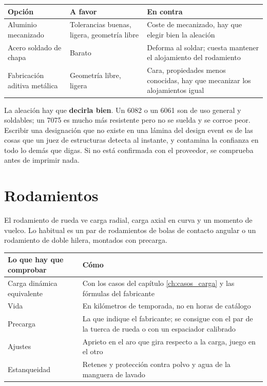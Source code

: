 \begin{center}
\begin{tabularx}{\textwidth}{@{}lXX@{}}
\toprule
\textbf{Opción} & \textbf{A favor} & \textbf{En contra} \\
\midrule
Aluminio mecanizado & Tolerancias buenas, ligera, geometría libre & Coste de mecanizado, hay que elegir bien la aleación \\
Acero soldado de chapa & Barato & Deforma al soldar; cuesta mantener el alojamiento del rodamiento \\
Fabricación aditiva metálica & Geometría libre, ligera & Cara, propiedades menos conocidas, hay que mecanizar los alojamientos igual \\
\bottomrule
\end{tabularx}
\end{center}

\begin{ojo}
La aleación hay que \textbf{decirla bien}. Un 6082 o un 6061 son de uso general
y soldables; un 7075 es mucho más resistente pero no se suelda y se corroe peor.
Escribir una designación que no existe en una lámina del design event es de las
cosas que un juez de estructuras detecta al instante, y contamina la confianza
en todo lo demás que digas. Si no está confirmada con el proveedor, se
comprueba antes de imprimir nada.
\end{ojo}

\section{Rodamientos}
\label{sec:componentes_suspension:04}

El rodamiento de rueda ve carga radial, carga axial en curva y un momento de
vuelco. Lo habitual es un par de rodamientos de bolas de contacto angular o un
rodamiento de doble hilera, montados con precarga.

\begin{center}
\begin{tabularx}{\textwidth}{@{}lX@{}}
\toprule
\textbf{Lo que hay que comprobar} & \textbf{Cómo} \\
\midrule
Carga dinámica equivalente & Con los casos del capítulo \ref{ch:casos_carga} y las fórmulas del fabricante \\
Vida & En kilómetros de temporada, no en horas de catálogo \\
Precarga & La que indique el fabricante; se consigue con el par de la tuerca de rueda o con un espaciador calibrado \\
Ajustes & Aprieto en el aro que gira respecto a la carga, juego en el otro \\
Estanqueidad & Retenes y protección contra polvo y agua de la manguera de lavado \\
\bottomrule
\end{tabularx}
\end{center}

